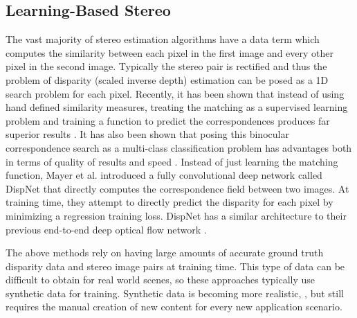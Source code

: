 \documentclass[10pt,twocolumn,letterpaper]{article}
\makeatletter
\newcommand*{\ea}{et al.\@\xspace}
\makeatother
\begin{document}
\subsection*{Learning-Based Stereo}
The vast majority of stereo estimation algorithms have a data term which computes the similarity between each pixel in the first image and every other pixel in the second image.
Typically the stereo pair is rectified and thus the problem of disparity (\ie scaled inverse depth) estimation can be posed as a 1D search problem for each pixel. 
Recently, it has been shown that instead of using hand defined similarity measures, treating the matching as a supervised learning problem and training a function to predict the correspondences produces far superior results \cite{vzbontar2016stereo, ladicky2015learning}.
It has also been shown that posing this binocular correspondence search as a multi-class classification problem has advantages both in terms of quality of results and speed \cite{luo16a}.
Instead of just learning the matching function, Mayer \ea\cite{mayer2015large} introduced a fully convolutional \cite{shelhamer2016fully} deep network called DispNet that directly computes the correspondence field between two images.
At training time, they attempt to directly predict the disparity for each pixel by minimizing a regression training loss. 
DispNet has a similar architecture to their previous end-to-end deep optical flow network \cite{fischer2015flownet}.

The above methods rely on having large amounts of accurate ground truth disparity data and stereo image pairs at training time.
This type of data can be difficult to obtain for real world scenes, so these approaches typically use synthetic data for training. 
Synthetic data is becoming more realistic, \eg\cite{gaidon2016virtual}, but still requires the manual creation of new content for every new application scenario.
\end{document}

